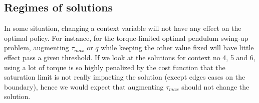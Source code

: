 \subsection{Regimes of solutions}

In some situation, changing a context variable will not have any effect on the optimal policy. For instance, for the torque-limited optimal pendulum swing-up problem, augmenting $\tau_{max}$ or $q$ while keeping the other value fixed will have little effect pass a given threshold. If we look at the solutions for context no 4, 5 and 6, using a lot of torque is so highly penalized by the cost function that the saturation limit is not really impacting the solution (except edges cases on the boundary), hence we would expect that augmenting $\tau_{max}$ should not change the solution. 

